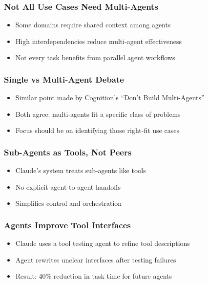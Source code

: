 \begin{frame}[fragile]\frametitle{Not All Use Cases Need Multi-Agents}
    \begin{itemize}
        \item Some domains require shared context among agents
        \item High interdependencies reduce multi-agent effectiveness
        \item Not every task benefits from parallel agent workflows
    \end{itemize}
\end{frame}

\begin{frame}[fragile]\frametitle{Single vs Multi-Agent Debate}
    \begin{itemize}
        \item Similar point made by Cognition's ``Don't Build Multi-Agents''
        \item Both agree: multi-agents fit a specific class of problems
        \item Focus should be on identifying those right-fit use cases
    \end{itemize}
\end{frame}

\begin{frame}[fragile]\frametitle{Sub-Agents as Tools, Not Peers}
    \begin{itemize}
        \item Claude's system treats sub-agents like tools
        \item No explicit agent-to-agent handoffs
        \item Simplifies control and orchestration
    \end{itemize}
\end{frame}

\begin{frame}[fragile]\frametitle{Agents Improve Tool Interfaces}
    \begin{itemize}
        \item Claude uses a tool testing agent to refine tool descriptions
        \item Agent rewrites unclear interfaces after testing failures
        \item Result: 40\% reduction in task time for future agents
    \end{itemize}
\end{frame}

